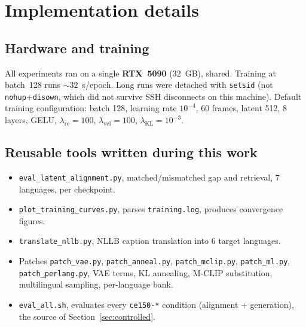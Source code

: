 \documentclass[11pt,a4paper]{report}
\newcommand{\lkl}{\ensuremath{\lambda_{\mathrm{KL}}}}
\newcommand{\lrc}{\ensuremath{\lambda_{\mathrm{rc}}}}
\newcommand{\lvel}{\ensuremath{\lambda_{\mathrm{vel}}}}
\begin{document}
\chapter{Implementation details}
\label{app:impl}

\section{Hardware and training}
All experiments ran on a single \textbf{RTX~5090} (32~GB), shared. Training
at batch~128 runs ${\sim}32$~s/epoch. Long runs were detached with
\texttt{setsid} (not \texttt{nohup}+\texttt{disown}, which did not survive
SSH disconnects on this machine). Default training configuration: batch
128, learning rate $10^{-4}$, 60 frames, latent 512, 8 layers, GELU,
$\lrc=100$, $\lvel=100$, $\lkl=10^{-3}$.

\section{Reusable tools written during this work}
\begin{itemize}[leftmargin=*]
\item \texttt{eval\_latent\_alignment.py}, matched/mismatched gap and
 retrieval, 7 languages, per checkpoint.
\item \texttt{plot\_training\_curves.py}, parses \texttt{training.log},
 produces convergence figures.
\item \texttt{translate\_nllb.py}, NLLB caption translation into 6
 target languages.
\item Patches \texttt{patch\_vae.py}, \texttt{patch\_anneal.py},
 \texttt{patch\_mclip.py}, \texttt{patch\_ml.py},
 \texttt{patch\_perlang.py}, VAE terms, KL annealing, M-CLIP
 substitution, multilingual sampling, per-language bank.
\item \texttt{eval\_all.sh}, evaluates every \texttt{ce150-*} condition
 (alignment + generation), the source of Section~\ref{sec:controlled}.
\end{itemize}
\end{document}
